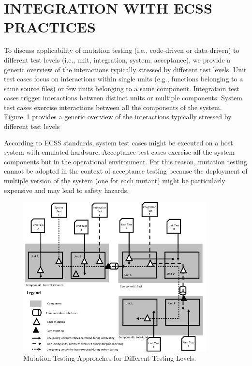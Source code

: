 
\STARTCHANGEDWPT
\section{INTEGRATION WITH ECSS PRACTICES}

To discuss applicability of mutation testing (i.e., code-driven or data-driven) to different test levels (i.e., unit, integration, system, acceptance), we provide a generic overview of the interactions typically stressed by different test levels. Unit test cases focus on interactions within single units (e.g., functions belonging to a same source files) or few units belonging to a same component. Integration test cases trigger interactions between distinct units or multiple components. System test cases exercise interactions between all the components of the system.
Figure~\ref{fig:mutationTestingVSTestingLevels} provides a generic overview of the interactions typically stressed by different test levels

According to ECSS standards, system test cases might be executed on a host system with emulated hardware. Acceptance test cases exercise all the system components but in the operational environment. For this reason, mutation testing cannot be adopted in the context of acceptance testing because the deployment of multiple version of the system (one for each mutant) might be particularly expensive and may lead to safety hazards.

\begin{figure}[h]
  \centering
    \includegraphics[width=10cm]{images/TestingLevels}
      \caption{Mutation Testing Approaches for Different Testing Levels.}
      \label{fig:mutationTestingVSTestingLevels}
\end{figure}

